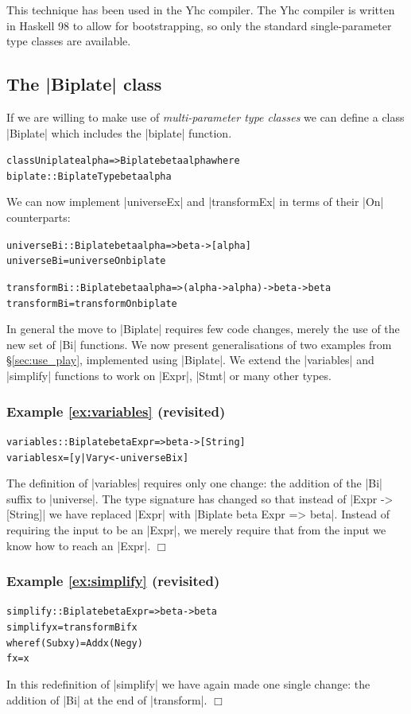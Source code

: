 \documentclass[preprint]{sigplanconf}
\let\cite=\citep
\newcommand{\noexample}{\hfill$\Box$}
\newenvironment{code}{\begin{alltt}\small}{\end{alltt}}
\newenvironment{revisit}[1]{\subsubsection*{Example #1 (revisited)}}{\noexample}
\newcommand{\ignore}{}
\begin{document}
This technique has been used in the Yhc compiler. The Yhc compiler is written in Haskell 98 to allow for bootstrapping, so only the standard single-parameter type classes are available.

\subsection{The |Biplate| class}

If we are willing to make use of \textit{multi-parameter type classes} \cite{jones:mptc} we can define a class |Biplate| which includes the |biplate| function.

\begin{code}
class  Uniplate alpha => Biplate beta alpha where
       biplate :: BiplateType beta alpha
\end{code}

We can now implement |universeEx| and |transformEx| in terms of their |On| counterparts:

\begin{code}
universeBi   :: Biplate beta alpha => beta -> [alpha]
universeBi   = universeOn   biplate

transformBi  :: Biplate beta alpha => (alpha -> alpha) -> beta -> beta
transformBi  = transformOn  biplate
\end{code}

In general the move to |Biplate| requires few code changes, merely the use of the new set of |Bi| functions. We now present generalisations of two examples from \S\ref{sec:use_play}, implemented using |Biplate|. We extend the |variables| and |simplify| functions to work on |Expr|, |Stmt| or many other types.

\begin{revisit}{\ref{ex:variables}}
\begin{code}
variables :: Biplate beta Expr => beta -> [String]
variables x = [y | Var y <- universeBi x]
\end{code}

The definition of |variables| requires only one change: the addition of the |Bi| suffix to |universe|. The type signature has changed so that instead of \ignore|Expr -> [String]| we have replaced |Expr| with \ignore|Biplate beta Expr => beta|. Instead of requiring the input to be an |Expr|, we merely require that from the input we know how to reach an |Expr|.
\end{revisit}

\begin{revisit}{\ref{ex:simplify}}
\begin{code}
simplify :: Biplate beta Expr => beta -> beta
simplify x = transformBi f x
    where  f (Sub x y)  = Add x (Neg y)
           f x          = x
\end{code}

In this redefinition of |simplify| we have again made one single change: the addition of |Bi| at the end of |transform|.
\end{revisit}
\end{document}
